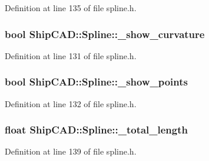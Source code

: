 Definition at line 135 of file spline.\-h.

\hypertarget{classShipCAD_1_1Spline_a5b5ebff933cd6fc2d59e0412bf342591}{
\subsubsection[{\-\_\-show\-\_\-curvature}]{\setlength{\rightskip}{0pt plus 5cm}bool Ship\-C\-A\-D\-::\-Spline\-::\-\_\-show\-\_\-curvature\hspace{0.3cm}{\ttfamily [protected]}}}\label{classShipCAD_1_1Spline_a5b5ebff933cd6fc2d59e0412bf342591}


Definition at line 131 of file spline.\-h.

\hypertarget{classShipCAD_1_1Spline_af850b71f44eaced42ede035d73cb4271}{
\subsubsection[{\-\_\-show\-\_\-points}]{\setlength{\rightskip}{0pt plus 5cm}bool Ship\-C\-A\-D\-::\-Spline\-::\-\_\-show\-\_\-points\hspace{0.3cm}{\ttfamily [protected]}}}\label{classShipCAD_1_1Spline_af850b71f44eaced42ede035d73cb4271}


Definition at line 132 of file spline.\-h.

\hypertarget{classShipCAD_1_1Spline_ae9e5a60e0a8722d9a3cd483f6019e4e9}{
\subsubsection[{\-\_\-total\-\_\-length}]{\setlength{\rightskip}{0pt plus 5cm}float Ship\-C\-A\-D\-::\-Spline\-::\-\_\-total\-\_\-length\hspace{0.3cm}{\ttfamily [protected]}}}\label{classShipCAD_1_1Spline_ae9e5a60e0a8722d9a3cd483f6019e4e9}


Definition at line 139 of file spline.\-h.



